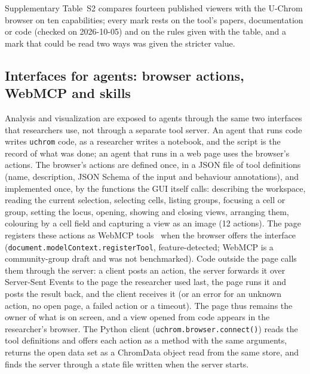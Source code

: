 \documentclass[11pt]{article}
\newcommand{\pkg}[1]{\texttt{#1}}
\begin{document}
Supplementary Table~S2 compares fourteen published viewers with the U-Chrom browser on ten capabilities; every mark rests on the tool's papers, documentation or code (checked on 2026-10-05) and on the rules given with the table, and a mark that could be read two ways was given the stricter value.

\subsection*{Interfaces for agents: browser actions, WebMCP and skills}
Analysis and visualization are exposed to agents through the same two interfaces that researchers use, not through a separate tool server.
An agent that runs code writes \pkg{uchrom} code, as a researcher writes a notebook, and the script is the record of what was done; an agent that runs in a web page uses the browser's actions.
The browser's actions are defined once, in a JSON file of tool definitions (name, description, JSON Schema of the input and behaviour annotations), and implemented once, by the functions the GUI itself calls: describing the workspace, reading the current selection, selecting cells, listing groups, focusing a cell or group, setting the locus, opening, showing and closing views, arranging them, colouring by a cell field and capturing a view as an image (12 actions).
The page registers these actions as WebMCP tools~\citep{webmcp} when the browser offers the interface (\pkg{document.modelContext.registerTool}, feature-detected; WebMCP is a community-group draft and was not benchmarked).
Code outside the page calls them through the server: a client posts an action, the server forwards it over Server-Sent Events to the page the researcher used last, the page runs it and posts the result back, and the client receives it (or an error for an unknown action, no open page, a failed action or a timeout).
The page thus remains the owner of what is on screen, and a view opened from code appears in the researcher's browser.
The Python client (\pkg{uchrom.browser.connect()}) reads the tool definitions and offers each action as a method with the same arguments, returns the open data set as a ChromData object read from the same store, and finds the server through a state file written when the server starts.
\end{document}
